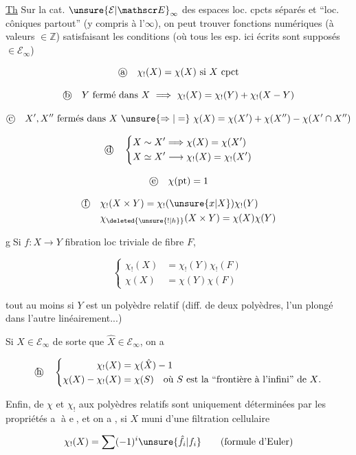 
\uline{Th} Sur la cat. $\unsure{\mathcal E|\mathscr E}_\infty$ des espaces loc. cpcts séparés et  ``loc. côniques partout'' (y compris à l'$\infty$), on peut trouver  fonctions numériques \inserted{$\chi_!,\chi$} (à valeurs $\in\mathbb Z$) satisfaisant les conditions (où tous les esp. ici écrits sont supposés $\in\mathcal E_\infty$)

\[
\text{\textcircled{a}}\quad\chi_!(X)=\chi(X)\text{ si }X\text{ cpct}
\]

\[
\text{\textcircled{b}}\quad Y\text{ fermé dans }X\ \Longrightarrow\ \chi_!(X)=\chi_!(Y)+\chi_!(X-Y)
\]

\[
\text{\textcircled{c}}\quad X',X''\text{ fermés dans }X\ \unsure{\Rightarrow|=}\ \chi(X)=\chi(X')+\chi(X'')-\chi(X'\cap X'')
\]

\[
\text{\textcircled{d}}\quad\left\{\begin{aligned}
X\sim X' &\Longrightarrow \chi(X)=\chi(X')\\
X\simeq X' &\longrightarrow \chi_!(X)=\chi_!(X')
\end{aligned}\right.
\]

\[
\text{\textcircled{e}}\quad\chi(\mathrm{pt})=1
\]

\[
\begin{aligned}
\text{\textcircled{f}}\quad&\chi_!(X\times Y)=\chi_!(\unsure{x|X})\chi_!(Y)\\
&\chi_{\deleted{\unsure{!|h}}}(X\times Y)=\chi(X)\chi(Y)
\end{aligned}
\]

\textcircled{g}\quad Si $f:X\longrightarrow Y$ fibration loc triviale de fibre $F$,

\[
\left\{\begin{aligned}
\chi_!(X)&=\chi_!(Y)\chi_!(F)\\
\chi(X)&=\chi(Y)\chi(F)
\end{aligned}\right.
\]

tout au moins si $Y$ est un polyèdre relatif (diff. de deux polyèdres, l'un plongé dans l'autre linéairement...)


Si  $X\in\mathcal E_\infty$ de sorte que $\hat X\in\mathcal E_\infty$, on a

\[
\text{\textcircled{h}}\quad\left\{\begin{aligned}
\chi_!(X)&=\chi(\hat X)-1\\
\chi(X)-\chi_!(X)&=\chi(S)\quad\text{où $S$ est la ``frontière à l'infini'' de $X$.}
\end{aligned}\right.
\]

Enfin,  de  $\chi$ et $\chi_!$ aux polyèdres relatifs sont uniquement déterminées par les propriétés \textcircled{a} à \textcircled{e}, et on a , si $X$ muni d'une filtration cellulaire


\[
\chi_!(X)=\sum(-1)^i\unsure{\hat f_i|f_i}\qquad\text{(formule d'Euler)}
\]
